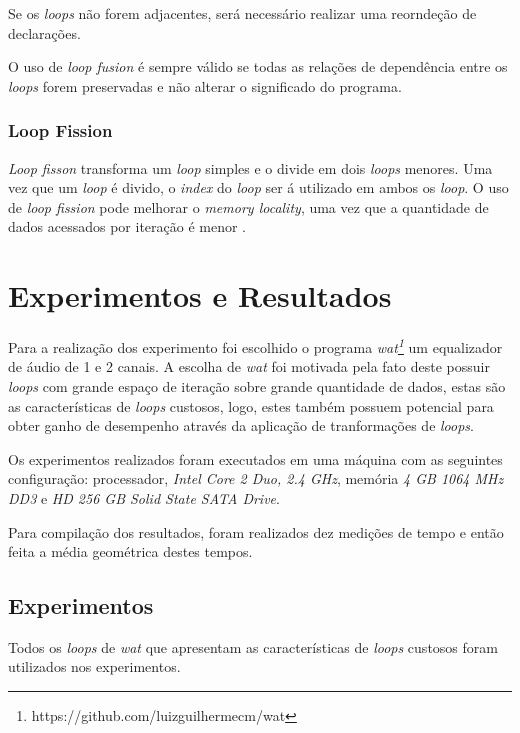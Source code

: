 \documentclass[12pt]{article}
\begin{document}
Se os \textit{loops} não forem adjacentes, será necessário realizar uma
reorndeção de declarações.

O uso de \textit{loop fusion} é sempre válido se todas as relações de 
dependência entre os \textit{loops} forem preservadas e não alterar o significado do
programa. 

\subsubsection{Loop Fission}

\textit{Loop fisson} transforma um \textit{loop} simples e o divide em dois
\textit{loops} menores. 
Uma vez que um \textit{loop} é divido, o \textit{index} do \textit{loop} ser á
utilizado em ambos os \textit{loop}.
O uso de \textit{loop fission} pode melhorar o \textit{memory locality}, uma vez
que a quantidade de dados acessados por iteração é menor \cite{hpcfpc}.


\section{Experimentos e Resultados}
\label{sec:experimentos}

Para a realização dos experimento foi escolhido o programa 
\textit{wat\footnote{https://github.com/luizguilhermecm/wat}} 
um equalizador de áudio de 1 e 2 canais.
A escolha de \textit{wat} foi motivada pela fato deste possuir
\textit{loops} com grande espaço de iteração sobre grande quantidade 
de dados, estas são as características de \textit{loops} custosos, logo, estes 
também possuem potencial para obter ganho de desempenho através da aplicação de 
tranformações de \textit{loops}.

Os experimentos realizados foram executados em uma máquina com as seguintes
configuração: processador, \textit{Intel Core 2 Duo, 2.4 GHz}, 
memória \textit{4 GB 1064 MHz DD3} e 
\textit{HD 256 GB Solid State SATA Drive}.

Para compilação dos resultados, foram realizados dez medições de tempo e então
feita a média geométrica destes tempos.

\subsection{Experimentos}

Todos os \textit{loops} de \textit{wat} que apresentam as características 
de \textit{loops} custosos foram utilizados nos experimentos. 
\end{document}

